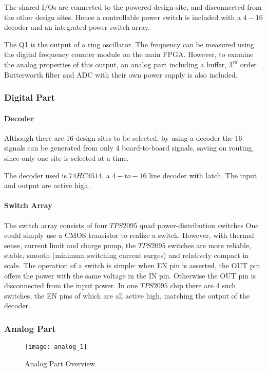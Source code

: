 The shared I/Os are connected to the powered design site, and disconnected from the other
design sites. Hence a controllable power switch is included with a $4-16$ decoder and an
integrated power switch array.

The Q1 is the output of a ring oscillator. The frequency can be measured using the digital
frequency counter module on the main FPGA. However, to examine the analog properties of this output,
an analog part including a buffer, $3^{rd}$ order Butterworth filter and ADC with their own power supply is also included.


\subsubsection{Digital Part}

\paragraph{Decoder}

Although there are 16 design sites to be selected, by using a decoder the 16
signals can be generated from only 4 board-to-board signals, saving on routing, since only one
site is selected at a time.

The decoder used is $74HC4514$, a $4-to-16$ line decoder with latch. The input and output are active high.

\paragraph{Switch Array}

The switch array consists of four $TPS2095$ quad power-distribution switches
 One could simply use a CMOS transistor to realize a switch. However, with thermal sense,
current limit and charge pump, the $TPS2095$ switches are more reliable, stable, smooth
(minimum switching current surges) and relatively compact in scale.
The operation of a switch is simple: when EN pin is asserted, the OUT pin offers
the power with the same voltage in the IN pin. Otherwise the OUT pin is disconnected
from the input power. In one $TPS2095$ chip there are 4 such switches, the EN pins of which are all active high, matching the output of the decoder.


\subsubsection{Analog Part}

\begin{figure}
 \centering
 \texttt{[image: analog\_1]}
 \caption{Analog Part Overview.}
 \label{fig:analog_overview}
\end{figure}

